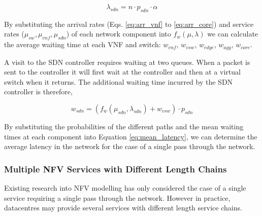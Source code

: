 \begin{equation}
\label{eq:arr_sdn}
\lambda_{sdn} = n \cdot p_{sdn} \cdot \alpha
\end{equation}

By substituting the arrival rates (Eqs. \ref{eq:arr_vnf} to \ref{eq:arr_core}) and service rates ($\mu_{sw}, \mu_{vnf}, \mu_{sdn}$) of each network component into $f_w(\mu, \lambda)$ we can calculate the average waiting time at each VNF and switch: $w_{vnf}$, $w_{vsw}$, $w_{edge}$, $w_{agg}$, $w_{core}$.

A visit to the SDN controller requires waiting at two queues. When a packet is sent to the controller it will first wait at the controller and then at a virtual switch when it returns. The additional waiting time incurred by the SDN controller is therefore,

\begin{equation}
\label{eq:wait_sdn}
w_{sdn} = (f_w(\mu_{sdn}, \lambda_{sdn}) + w_{vsw}) \cdot p_{sdn}
\end{equation}

By substituting the probabilities of the different paths and the mean waiting times at each component into Equation \ref{eq:mean_latency}, we can determine the average latency in the network for the case of a single pass through the network.

\subsubsection{Multiple NFV Services with Different Length Chains} \label{multiple}
Existing research into NFV modelling has only considered the case of a single service requiring a single pass through the network. However in practice, datacentres may provide several services with different length service chains.


